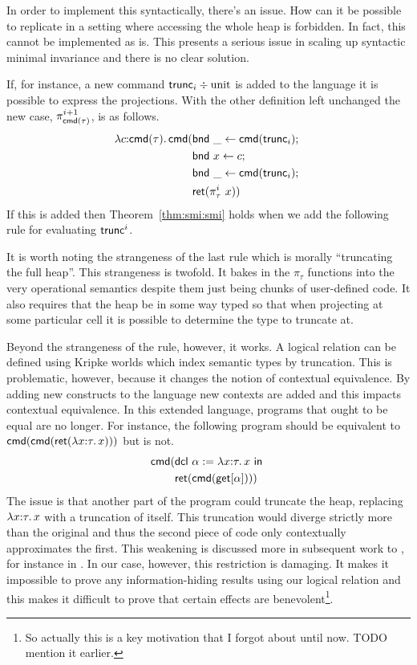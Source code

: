 In order to implement this syntactically, there's an issue. How can it
be possible to replicate in a setting where accessing the whole heap
is forbidden. In fact, this cannot be implemented as is. This presents
a serious issue in scaling up syntactic minimal invariance and there
is no clear solution.

If, for instance, a new command $\mathsf{trunc}_i \div \mathrm{unit}$ is
added to the language it is possible to express the projections. With
the other definition left unchanged the new case,
$\pi_{\mathsf{cmd}(\tau)}^{i + 1}$, is as follows.
\begin{align*}
  \lambda c {:} \mathsf{cmd}(\tau).\, \mathsf{cmd}(& \mathsf{bnd}\ \_ \gets \mathsf{cmd}(\mathsf{trunc}_i);\ \\
        & \mathsf{bnd}\ x \gets c;\ \\
        & \mathsf{bnd}\ \_ \gets \mathsf{cmd}(\mathsf{trunc}_i);\ \\
        & \mathsf{ret}(\pi_\tau^i\ x))
\end{align*}
If this is added then Theorem~\ref{thm:smi:smi} holds when we add the
following rule for evaluating $\mathsf{trunc}^i$.
It is worth noting the strangeness of the last rule which is morally
``truncating the full heap''. This strangeness is twofold. It bakes in
the $\pi_\tau$ functions into the very operational semantics despite
them just being chunks of user-defined code. It also requires that the
heap be in some way typed so that when projecting at some particular
cell it is possible to determine the type to truncate at.

Beyond the strangeness of the rule, however, it works. A logical
relation can be defined using Kripke worlds which index semantic types
by truncation. This is problematic, however, because it changes the
notion of contextual equivalence. By adding new constructs to the
language new contexts are added and this impacts contextual
equivalence. In this extended language, programs that ought to be
equal are no longer. For instance, the following program should be
equivalent to $\mathsf{cmd}(\mathsf{cmd}(\mathsf{ret}(\lambda x {:} \tau.\, x)))$ but is not.
\begin{align*}
  \mathsf{cmd}(& \mathsf{dcl}\ \alpha := \lambda x {:} \tau.\, x\ \mathsf{in}\ \\
       & \mathsf{ret}(\mathsf{cmd}(\mathsf{get}[\alpha])))
\end{align*}
The issue is that another part of the program could truncate the heap,
replacing $\lambda x {:} \tau.\, x$ with a truncation of itself. This
truncation would diverge strictly more than the original and thus the
second piece of code only contextually approximates the first. This
weakening is discussed more in subsequent work to
\citet{Birkedal:domain:10}, for instance in
\citet{Birkedal:adts:12}. In our case, however, this restriction is
damaging. It makes it impossible to prove any information-hiding
results using our logical relation and this makes it difficult to
prove that certain effects are benevolent\footnote{So actually this is
  a key motivation that I forgot about until now. TODO mention it
  earlier.}.

